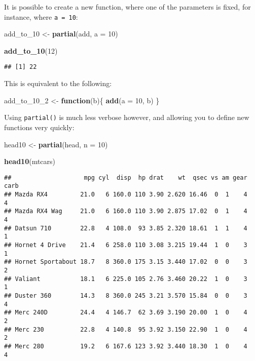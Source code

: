 \documentclass[
]{article}
\newenvironment{Shaded}{\begin{snugshade}}{\end{snugshade}}
\newcommand{\ControlFlowTok}[1]{\textcolor[rgb]{0.13,0.29,0.53}{\textbf{#1}}}
\newcommand{\DataTypeTok}[1]{\textcolor[rgb]{0.13,0.29,0.53}{#1}}
\newcommand{\DecValTok}[1]{\textcolor[rgb]{0.00,0.00,0.81}{#1}}
\newcommand{\KeywordTok}[1]{\textcolor[rgb]{0.13,0.29,0.53}{\textbf{#1}}}
\newcommand{\NormalTok}[1]{#1}
\newcommand{\StringTok}[1]{\textcolor[rgb]{0.31,0.60,0.02}{#1}}
\begin{document}
It is possible to create a new function, where one of the parameters is fixed, for instance, where
\texttt{a\ =\ 10}:

\begin{Shaded}
\begin{Highlighting}[]
\NormalTok{add\_to\_}\DecValTok{10}\NormalTok{ \textless{}{-}}\StringTok{ }\KeywordTok{partial}\NormalTok{(add, }\DataTypeTok{a =} \DecValTok{10}\NormalTok{)}
\end{Highlighting}
\end{Shaded}

\begin{Shaded}
\begin{Highlighting}[]
\KeywordTok{add\_to\_10}\NormalTok{(}\DecValTok{12}\NormalTok{)}
\end{Highlighting}
\end{Shaded}

\begin{verbatim}
## [1] 22
\end{verbatim}

This is equivalent to the following:

\begin{Shaded}
\begin{Highlighting}[]
\NormalTok{add\_to\_}\DecValTok{10}\NormalTok{\_}\DecValTok{2}\NormalTok{ \textless{}{-}}\StringTok{ }\ControlFlowTok{function}\NormalTok{(b)\{}
  \KeywordTok{add}\NormalTok{(}\DataTypeTok{a =} \DecValTok{10}\NormalTok{, b)}
\NormalTok{\}}
\end{Highlighting}
\end{Shaded}

Using \texttt{partial()} is much less verbose however, and allowing you to define new functions very quickly:

\begin{Shaded}
\begin{Highlighting}[]
\NormalTok{head10 \textless{}{-}}\StringTok{ }\KeywordTok{partial}\NormalTok{(head, }\DataTypeTok{n =} \DecValTok{10}\NormalTok{)}

\KeywordTok{head10}\NormalTok{(mtcars)}
\end{Highlighting}
\end{Shaded}

\begin{verbatim}
##                    mpg cyl  disp  hp drat    wt  qsec vs am gear carb
## Mazda RX4         21.0   6 160.0 110 3.90 2.620 16.46  0  1    4    4
## Mazda RX4 Wag     21.0   6 160.0 110 3.90 2.875 17.02  0  1    4    4
## Datsun 710        22.8   4 108.0  93 3.85 2.320 18.61  1  1    4    1
## Hornet 4 Drive    21.4   6 258.0 110 3.08 3.215 19.44  1  0    3    1
## Hornet Sportabout 18.7   8 360.0 175 3.15 3.440 17.02  0  0    3    2
## Valiant           18.1   6 225.0 105 2.76 3.460 20.22  1  0    3    1
## Duster 360        14.3   8 360.0 245 3.21 3.570 15.84  0  0    3    4
## Merc 240D         24.4   4 146.7  62 3.69 3.190 20.00  1  0    4    2
## Merc 230          22.8   4 140.8  95 3.92 3.150 22.90  1  0    4    2
## Merc 280          19.2   6 167.6 123 3.92 3.440 18.30  1  0    4    4
\end{verbatim}
\end{document}
